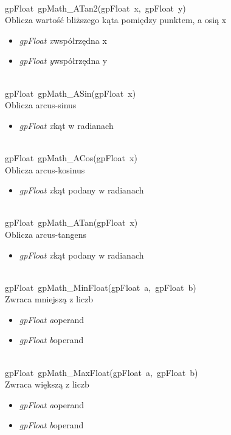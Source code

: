  \ \\
\mbox{\textsf{gpFloat gpMath_ATan2(gpFloat x, gpFloat y)}} \\ \indent Oblicza wartość bliższego kąta pomiędzy punktem, a osią x
	\begin{itemize}
		\item \textit{gpFloat x}\quad współrzędna x
		\item \textit{gpFloat y}\quad współrzędna y
	\end{itemize}

 \ \\
\mbox{\textsf{gpFloat gpMath_ASin(gpFloat x)}} \\ \indent Oblicza arcus-sinus
	\begin{itemize}
		\item \textit{gpFloat x}\quad kąt w radianach
	\end{itemize}

 \ \\
\mbox{\textsf{gpFloat gpMath_ACos(gpFloat x)}} \\ \indent Oblicza arcus-kosinus
	\begin{itemize}
		\item \textit{gpFloat x}\quad kąt podany w radianach
	\end{itemize}

 \ \\
\mbox{\textsf{gpFloat gpMath_ATan(gpFloat x)}} \\ \indent Oblicza arcus-tangens
	\begin{itemize}
		\item \textit{gpFloat x}\quad kąt podany w radianach
	\end{itemize}

 \ \\
\mbox{\textsf{gpFloat gpMath_MinFloat(gpFloat a, gpFloat b)}} \\ \indent Zwraca mniejszą z liczb
	\begin{itemize}
		\item \textit{gpFloat a}\quad operand
		\item \textit{gpFloat b}\quad operand
	\end{itemize}

 \ \\
\mbox{\textsf{gpFloat gpMath_MaxFloat(gpFloat a, gpFloat b)}} \\ \indent Zwraca większą z liczb
	\begin{itemize}
		\item \textit{gpFloat a}\quad operand
		\item \textit{gpFloat b}\quad operand
	\end{itemize}

